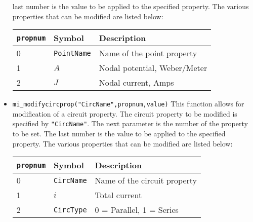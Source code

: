 \begin{itemize}
last number is the value to be applied to the specified property.
The various properties that can be modified are listed below:
\begin{center}
\begin{tabular}{lll} \hline
{\tt propnum}& Symbol & Description \\ \hline
 0 & {\tt PointName} & Name of the point property \\
 1 & $A$ & Nodal potential, Weber/Meter \\
 2 & $J$ & Nodal current, Amps \\ \hline
\end{tabular}
\end{center}
\item{\verb+mi_modifycircprop("CircName",propnum,value)+}
This function allows for modification of a circuit property. The
circuit property to be modified is specified by {\tt "CircName"}.
The next parameter is the number of the property to be set. The
last number is the value to be applied to the specified property.
The various properties that can be modified are listed below:
\begin{center}
\begin{tabular}{lll} \hline
{\tt propnum}& Symbol & Description \\ \hline
 0 & {\tt CircName} & Name of the circuit property \\
 1 & $i$ & Total current \\
 2 & {\tt CircType} & 0 = Parallel, 1 = Series \\ \hline
 \end{tabular}
 \end{center}
\end{itemize}

